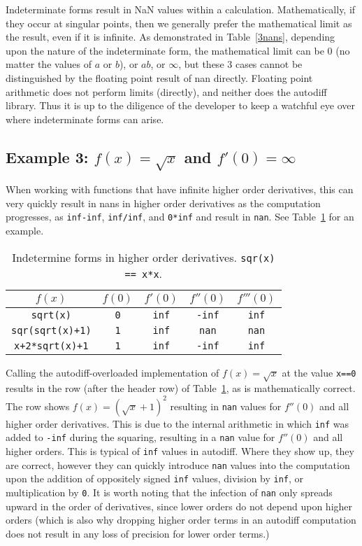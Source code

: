 \documentclass{article}
\begin{document}
Indeterminate forms result in NaN values within a calculation. Mathematically, if they occur at singular points, then
we generally prefer the mathematical limit as the result, even if it is infinite. As demonstrated in Table~\ref{3nans},
depending upon the nature of the indeterminate form, the mathematical limit can be 0 (no matter the values of
$a$ or $b$), or $ab$, or $\infty$, but these 3 cases cannot be distinguished by the floating point result of nan
directly. Floating point arithmetic does not perform limits (directly), and neither does the autodiff library.
Thus it is up to the diligence of the developer to keep a watchful eye over where indeterminate forms can arise.

\subsection{Example 3: $f(x)=\sqrt x$ and $f'(0)=\infty$}

When working with functions that have infinite higher order derivatives, this can very quickly result in nans
in higher order derivatives as the computation progresses, as {\tt inf-inf}, {\tt inf/inf}, and {\tt 0*inf} and
result in {\tt nan}. See Table~\ref{sqrtnan} for an example.

\begin{table}[h]
\centering\begin{tabular}{c||c|c|c|c}
$f(x)$ & $f(0)$ & $f'(0)$ & $f''(0)$ & $f'''(0)$ \\
\hline\hline
{\tt sqrt(x)} & {\tt 0} & {\tt inf} & {\tt -inf} & {\tt inf} \\
\hline
{\tt sqr(sqrt(x)+1)} & {\tt 1} & {\tt inf} & {\tt nan} & {\tt nan} \\
\hline
{\tt x+2*sqrt(x)+1} & {\tt 1} & {\tt inf} & {\tt -inf}& {\tt inf}
\end{tabular}
\caption{Indetermine forms in higher order derivatives. {\tt sqr(x) == x*x}.}\label{sqrtnan}
\end{table}

Calling the autodiff-overloaded implementation of $f(x)=\sqrt x$ at the value {\tt x==0} results in the
 row (after the header row) of Table~\ref{sqrtnan}, as is mathematically correct. The  row shows
$f(x)=(\sqrt{x}+1)^2$ resulting in {\tt nan} values for $f''(0)$ and all higher order derivatives. This is due to
the internal arithmetic in which {\tt inf} was added to {\tt -inf} during the squaring, resulting in a {\tt nan}
value for $f''(0)$ and all higher orders. This is typical of {\tt inf} values in autodiff. Where they show up,
they are correct, however they can quickly introduce {\tt nan} values into the computation upon the addition of
oppositely signed {\tt inf} values, division by {\tt inf}, or multiplication by {\tt 0}. It is worth noting that
the infection of {\tt nan} only spreads upward in the order of derivatives, since lower orders do not depend upon
higher orders (which is also why dropping higher order terms in an autodiff computation does not result in any
loss of precision for lower order terms.)
\end{document}
